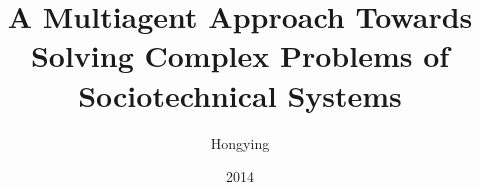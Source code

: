 \documentclass{uscthesis}
\title{A Multiagent Approach Towards Solving Complex Problems of Sociotechnical Systems}
\author{Hongying}{Du}    %
\date{2014}                      %
\begin{document}










\Appendix                 %
	

\end{document}
